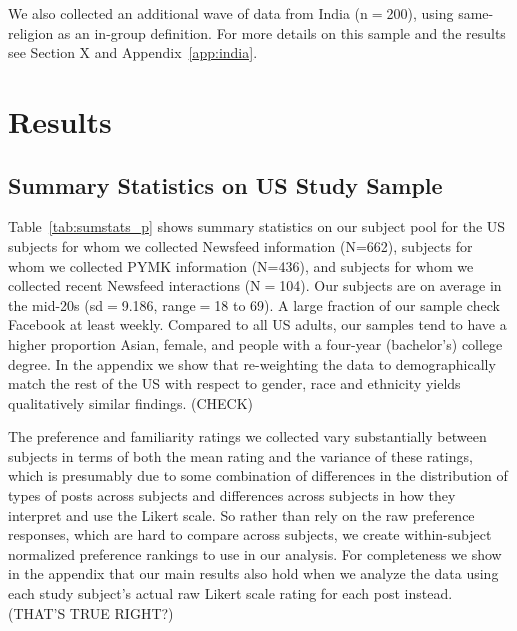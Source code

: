 \documentclass[12pt,letterpaper]{article}
\newcommand{\FullNFUSSurveySampleSize}{662}
\newcommand{\PYMKUSSurveySampleSize}{436}
\newcommand{\NFnPYMKIndiaSurveySampleSize}{200}
\newcommand{\RecentInteractionsSampleSize}{104}
\begin{document}
We also collected an additional wave of data from India (n$=$\NFnPYMKIndiaSurveySampleSize{}), using same-religion as an in-group definition. For more details on this sample and the results see Section X and Appendix~\ref{app:india}.


\section{Results}

\subsection{Summary Statistics on US Study Sample}

Table~\ref{tab:sumstats_p} shows summary statistics on our subject pool for the US subjects for whom we collected Newsfeed information (N=\FullNFUSSurveySampleSize{}), subjects for whom we collected PYMK information (N=\PYMKUSSurveySampleSize{}), and subjects for whom we collected recent Newsfeed interactions (N$=$\RecentInteractionsSampleSize).  Our subjects are on average in the mid-20s (sd$=$9.186, range$=$18 to 69).  A large fraction of our sample check Facebook at least weekly. Compared to all US adults, our samples tend to have a higher proportion Asian, female, and people with a four-year (bachelor's) college degree. In the appendix we show that re-weighting the data to demographically match the rest of the US with respect to gender, race and ethnicity yields qualitatively similar findings. (CHECK) 

The preference and familiarity ratings we collected vary substantially between subjects in terms of both the mean rating and the variance of these ratings, which is presumably due to some combination of differences in the distribution of types of posts across subjects and differences across subjects in how they interpret and use the Likert scale. So rather than rely on the raw preference responses, which are hard to compare across subjects, we create within-subject normalized preference rankings to use in our analysis. For completeness we show in the appendix that our main results also hold when we analyze the data using each study subject's actual raw Likert scale rating for each post instead. (THAT'S TRUE RIGHT?)
\end{document}
